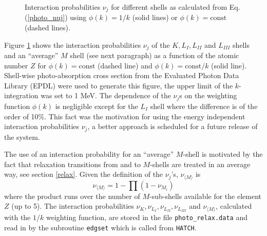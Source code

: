\begin{enumerate}
\begin{figure}[h]
\caption[Interaction probabilities for different shells]{\label{phot_intp}
Interaction probabilities $\nu_j$ for different shells as 
calculated from Eq. (\protect\ref{photo_nuj}) using 
$\phi(k)=1/k$ (solid lines) or $\phi(k)=\mbox{const}$ (dashed lines).}
\end{figure}
Figure \ref{phot_intp} shows the interaction probabilities 
$\nu_j$ of the $K, L_I, L_{II}$ and  $L_{III}$ shells and an 
``average'' $M$ shell (see next paragraph) 
as a function of the 
atomic number $Z$ for $\phi(k) = \mbox{const}$ (dashed line) 
and $\phi(k) = \mbox{const}/k$ (solid line). 
Shell-wise photo-absorption cross section from 
the Evaluated Photon Data Library (EPDL) \cite{Cu89} 
were used to generate this figure, the upper limit of 
the $k$-integration was set to 1 MeV. The dependence of 
the $\nu_j$s on the weighting function $\phi(k)$ is 
negligible except for the $L_I$ shell where the difference 
is of the order of 10\%. This fact was the motivation for 
using the energy independent interaction probabilities $\nu_j$, 
a better approach is scheduled for a future release of the 
system. 
 
The use of an interaction probability for an ``average'' $M$-shell 
is motivated by the fact that relaxation transitions from and to 
$M$-shells are treated in an average way, see section \ref{relax}.
Given the definition of the $\nu_j$'s, $\nu_{\langle M \rangle}$ is 
\begin{equation}
\nu_{\langle M \rangle} = 1 - \prod (1 - \nu_{M_i})
\end{equation}
where the product runs over the number of $M$-sub-shells available 
for the element $Z$ (up to 5). The interaction probabilities 
$\nu_K, \nu_{L_I}, \nu_{L_{II}}, \nu_{L_{III}}$ and $\nu_{\langle M \rangle}$, 
calculated with the $1/k$ weighting function, are stored in the 
file {\tt photo\_relax.data} and read in by the subroutine 
{\tt edgset} which is called from {\tt HATCH}.


\end{enumerate}

